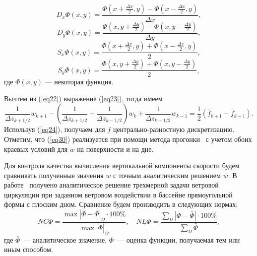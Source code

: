 \documentclass[press]{vestnik}
\begin{document}
\begin{equation}
\label{eq26}
D_{x} \Phi\left( {x,y} \right)=\frac{\Phi\left( {x+\frac{\Delta x}{2},y} 
\right)-\Phi\left( {x-\frac{\Delta x}{2},y} \right)}{\Delta x},
\end{equation}
\begin{equation}
\label{eq27}
D_{y} \Phi\left( {x,y} \right)=\frac{\Phi\left( {x,y+\frac{\Delta y}{2}} 
\right)-\Phi\left( {x,y-\frac{\Delta y}{2}} \right)}{\Delta y},
\end{equation}
\begin{equation}
\label{eq28}
S_{x} \Phi\left( {x,y} \right)=\frac{\Phi\left( {x+\frac{\Delta x}{2},y} 
\right)+\Phi\left( {x-\frac{\Delta x}{2},y} \right)}{2},
\end{equation}
\begin{equation}
\label{eq29}
S_{y} \Phi\left( {x,y} \right)=\frac{\Phi\left( {x,y+\frac{\Delta y}{2}} 
\right)+\Phi\left( {x,y-\frac{\Delta y}{2}} \right)}{2},
\end{equation}
где $\Phi\left( {x,y} \right)$ --- некоторая функция.

Вычтем из (\ref{eq22}) выражение (\ref{eq23}), тогда имеем
\begin{equation}
\label{eq30}
\frac{1}{\Delta z_{k+1/2} }w_{k+1} -\left( {\frac{1}{\Delta z_{k+1/2} 
}+\frac{1}{\Delta z_{k-1/2} }} \right)w_{k} +\frac{1}{\Delta z_{k-1/2} 
}w_{k-1} =\frac{1}{2}\left( {\bar f_{k+1} -\bar f_{k-1} } \right).
\end{equation}
Используя (\ref{eq24}), получаем для $f$ центрально-разностную дискретизацию. 
Отметим, что (\ref{eq30}) реализуется при помощи метода прогонки~\cite{B06} с учетом обоих 
краевых условий для $w$ на поверхности и на дне.

Для контроля качества вычисления вертикальной компоненты скорости будем 
сравнивать полученные значения $w$ с точным аналитическим решением 
$\bar{{w}}$. В работе~\cite{B03} получено аналитическое решение трехмерной задачи 
ветровой циркуляции при заданном ветровом воздействии в бассейне 
прямоугольной формы с плоским дном. Сравнение будем производить в следующих 
нормах:
\begin{equation}
\label{eq31}
NC\Phi=\frac{{\max \left| {\Phi-\bar{{\Phi}}} \right|}_{\Omega } \cdot 100\% 
}{{\max \left| {\bar{{\Phi}}} \right|}_{\Omega } },
\quad
NL\Phi=\frac{\sum\limits_\Omega {\left| {\Phi-\bar{{\Phi}}} \right|} \cdot 100\% 
}{\sum\limits_\Omega {\bar{{\Phi}}} },
\end{equation}
где $\bar{{\Phi}}$~--- аналитическое значение, $\Phi$~--- оценка функции, получаемая 
тем или иным способом.
\end{document}
